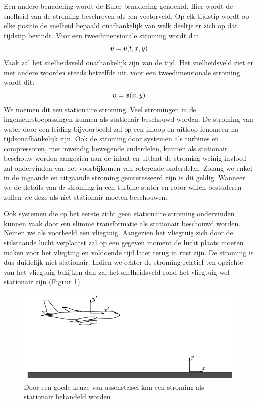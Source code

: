 Een andere benadering wordt de Euler benadering genoemd. Hier wordt de snelheid van de stroming beschreven als een vectorveld. Op elk tijdstip wordt op elke positie de snelheid bepaald onafhankelijk van welk deeltje er zich op dat tijdstip bevindt. Voor een tweedimensionale stroming wordt dit:
\begin{equation}
	\boldsymbol{v} = \boldsymbol{v}(t,x,y)
\end{equation}
Vaak zal het snelheidsveld onafhankelijk zijn van de tijd. Het snelheidsveld ziet er met andere woorden steeds hetzelfde uit. voor een tweedimensionale stroming wordt dit: 
\begin{equation}
	\boldsymbol{v} = \boldsymbol{v}(x,y)
\end{equation}
We noemen dit een stationaire stroming. Veel stromingen in de ingenieurstoepassingen kunnen als stationair beschouwd worden. De stroming van water door een leiding bijvoorbeeld zal op een inloop en uitloop fenomeen na tijdsonafhankelijk zijn. Ook de stroming door systemen als turbines en compressoren, met inwendig bewegende onderdelen, kunnen als stationair beschouw worden aangezien aan de inlaat en uitlaat de stroming weinig invloed zal ondervinden van het voorbijkomen van roterende onderdelen. Zolang we enkel in de ingaande en uitgaande stroming geïnteresseerd zijn is dit geldig. Wanneer we de details van de stroming in een turbine stator en rotor willen bestuderen zullen we deze als niet stationair moeten beschouwen.

Ook systemen die op het eerste zicht geen stationaire stroming ondervinden kunnen vaak door een slimme transformatie als stationair beschouwd worden. Nemen we als voorbeeld een vliegtuig. Aangezien het vliegtuig zich door de stilstaande lucht verplaatst zal op een gegeven moment de lucht plaats moeten maken voor het vliegtuig en voldoende tijd later terug in rust zijn. De stroming is dus duidelijk niet stationair. Indien we echter de stroming relatief ten opzichte van het vliegtuig bekijken dan zal het snelheidsveld rond het vliegtuig wel stationair zijn (Figuur \ref{fig:stationaire stroming vliegtuig}). 
\begin{figure}[htb]
	\centering
	\includegraphics{fig/basisbegrippen/Stationaire_stroming_vliegtuig}
	\caption{Door een goede keuze van assenstelsel kan een stroming als stationair behandeld worden}
	\label{fig:stationaire stroming vliegtuig}
\end{figure}

